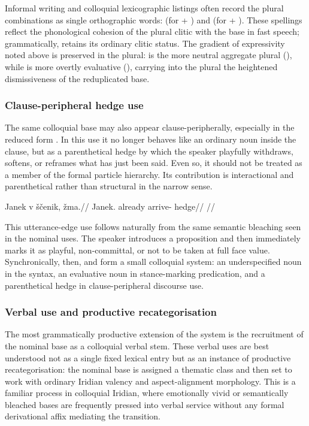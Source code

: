 Informal writing and colloquial lexicographic listings often record the plural
combinations as single orthographic words:  (for  +
) and  (for  + ). These spellings
reflect the phonological cohesion of the plural clitic with the base in fast
speech; grammatically,  retains its ordinary clitic status. The
gradient of expressivity noted above is preserved in the plural: 
is the more neutral aggregate plural (),
while  is more overtly evaluative (), carrying into the plural the heightened
dismissiveness of the reduplicated base.

\subsubsection{Clause-peripheral hedge use}

The same colloquial base may also appear clause-peripherally, especially in the
reduced form . In this use it no longer behaves like an ordinary noun
inside the clause, but as a parenthetical hedge by which the speaker playfully
withdraws, softens, or reframes what has just been said. Even so, it should not
be treated as a member of the formal particle hierarchy. Its contribution is
interactional and parenthetical rather than structural in the narrow sense.

\pex
\begingl
\gla Janek v ščenik, žma.//
\glb Janek.\Dir{} already arrive-\Pf{} hedge//
\glft {}//
\endgl
\xe

This utterance-edge use follows naturally from the same semantic bleaching seen
in the nominal uses. The speaker introduces a proposition and then immediately
marks it as playful, non-committal, or not to be taken at full face value.
Synchronically, then,  and  form a small colloquial system:
an underspecified noun in the syntax, an evaluative noun in stance-marking
predication, and a parenthetical hedge in clause-peripheral discourse use.

\subsubsection{Verbal use and productive recategorisation}\label{sec:spoken-zema-verbal}

The most grammatically productive extension of the  system is the
recruitment of the nominal base as a colloquial verbal stem. These verbal uses
are best understood not as a single fixed lexical entry but as an instance of
productive recategorisation: the nominal base is assigned a thematic class and
then set to work with ordinary Iridian valency and aspect-alignment morphology.
This is a familiar process in colloquial Iridian, where emotionally vivid or
semantically bleached bases are frequently pressed into verbal service without
any formal derivational affix mediating the transition.

